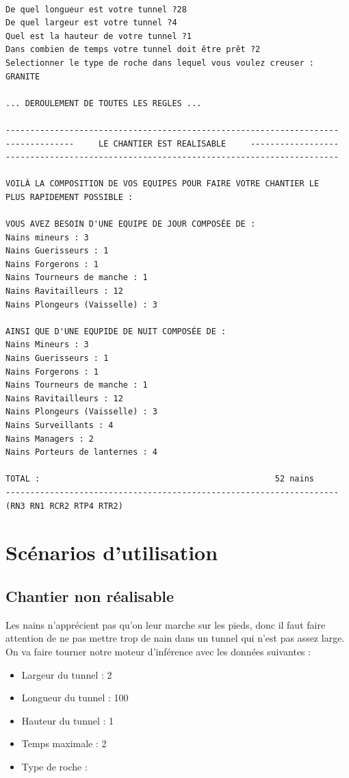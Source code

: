 \documentclass[a4paper,10pt]{report}
\begin{document}
    \begin{lstlisting}[basicstyle = \footnotesize]
    
De quel longueur est votre tunnel ?28
De quel largeur est votre tunnel ?4
Quel est la hauteur de votre tunnel ?1
Dans combien de temps votre tunnel doit être prêt ?2
Selectionner le type de roche dans lequel vous voulez creuser : GRANITE

... DEROULEMENT DE TOUTES LES REGLES ...

--------------------------------------------------------------------
--------------     LE CHANTIER EST REALISABLE     ------------------
--------------------------------------------------------------------

VOILÀ LA COMPOSITION DE VOS EQUIPES POUR FAIRE VOTRE CHANTIER LE 
PLUS RAPIDEMENT POSSIBLE : 

VOUS AVEZ BESOIN D'UNE EQUIPE DE JOUR COMPOSÉE DE : 
Nains mineurs : 3
Nains Guerisseurs : 1
Nains Forgerons : 1
Nains Tourneurs de manche : 1
Nains Ravitailleurs : 12
Nains Plongeurs (Vaisselle) : 3

AINSI QUE D'UNE EQUPIDE DE NUIT COMPOSÉE DE : 
Nains Mineurs : 3
Nains Guerisseurs : 1
Nains Forgerons : 1
Nains Tourneurs de manche : 1
Nains Ravitailleurs : 12
Nains Plongeurs (Vaisselle) : 3
Nains Surveillants : 4
Nains Managers : 2
Nains Porteurs de lanternes : 4

TOTAL :                                                52 nains
--------------------------------------------------------------------
(RN3 RN1 RCR2 RTP4 RTR2)
    \end{lstlisting}

\chapter{Scénarios d'utilisation}

  \section{Chantier non réalisable}
  
    Les nains n'apprécient pas qu'on leur marche sur les pieds, donc il faut faire attention de ne pas mettre trop de nain dans un tunnel qui n'est pas assez large.
    On va faire tourner notre moteur d'inférence avec les données suivantes : 
    \begin{itemize}
     \item Largeur du tunnel : 2
     \item Longueur du tunnel : 100
     \item Hauteur du tunnel : 1
     \item Temps maximale : 2
     \item Type de roche : 
    \end{itemize}
    
\end{document}
